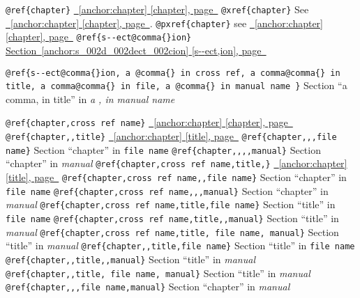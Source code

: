 \documentclass{book}
\begin{document}
\texttt{@ref\{chapter\}} \hyperref[anchor:chapter]{\chaptername~\ref*{anchor:chapter} [chapter], page~\pageref*{anchor:chapter}}
\texttt{@xref\{chapter\}} See \hyperref[anchor:chapter]{\chaptername~\ref*{anchor:chapter} [chapter], page~\pageref*{anchor:chapter}}.
\texttt{@pxref\{chapter\}} see \hyperref[anchor:chapter]{\chaptername~\ref*{anchor:chapter} [chapter], page~\pageref*{anchor:chapter}}
\texttt{@ref\{s{-}{-}ect@comma\{\}ion\}} \hyperref[anchor:s_002d_002dect_002cion]{Section~\ref*{anchor:s_002d_002dect_002cion} [s{-}{-}ect,ion], page~\pageref*{anchor:s_002d_002dect_002cion}}

\texttt{@ref\{s{-}{-}ect@comma\{\}ion, a @comma\{\} in cross
ref, a comma@comma\{\} in title, a comma@comma\{\} in file, a @comma\{\} in manual name \}}
Section ``a comma, in title'' in \textsl{a , in manual name}

\texttt{@ref\{chapter,cross ref name\}} \hyperref[anchor:chapter]{\chaptername~\ref*{anchor:chapter} [chapter], page~\pageref*{anchor:chapter}}
\texttt{@ref\{chapter,,title\}} \hyperref[anchor:chapter]{\chaptername~\ref*{anchor:chapter} [title], page~\pageref*{anchor:chapter}}
\texttt{@ref\{chapter,,,file name\}} Section ``chapter'' in \texttt{file name}
\texttt{@ref\{chapter,,,,manual\}} Section ``chapter'' in \textsl{manual}
\texttt{@ref\{chapter,cross ref name,title,\}} \hyperref[anchor:chapter]{\chaptername~\ref*{anchor:chapter} [title], page~\pageref*{anchor:chapter}}
\texttt{@ref\{chapter,cross ref name,,file name\}} Section ``chapter'' in \texttt{file name}
\texttt{@ref\{chapter,cross ref name,,,manual\}} Section ``chapter'' in \textsl{manual}
\texttt{@ref\{chapter,cross ref name,title,file name\}} Section ``title'' in \texttt{file name}
\texttt{@ref\{chapter,cross ref name,title,,manual\}} Section ``title'' in \textsl{manual}
\texttt{@ref\{chapter,cross ref name,title, file name, manual\}} Section ``title'' in \textsl{manual}
\texttt{@ref\{chapter,,title,file name\}} Section ``title'' in \texttt{file name}
\texttt{@ref\{chapter,,title,,manual\}} Section ``title'' in \textsl{manual}
\texttt{@ref\{chapter,,title, file name, manual\}} Section ``title'' in \textsl{manual}
\texttt{@ref\{chapter,,,file name,manual\}} Section ``chapter'' in \textsl{manual}
\end{document}
